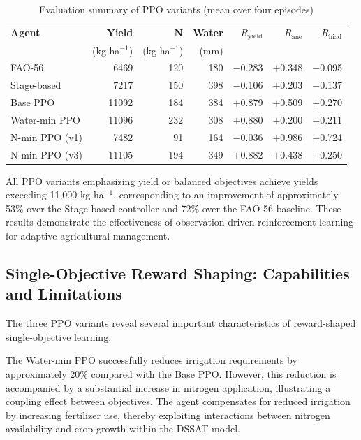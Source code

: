 \begin{table}[ht]
\centering
\caption{Evaluation summary of PPO variants (mean over four episodes)}
\label{tab:ppo_eval}
\small
\renewcommand{\arraystretch}{1.2}
\begin{tabular}{lrrrrrr}
\toprule
\textbf{Agent} & \textbf{Yield} & \textbf{N} & \textbf{Water} & $R_{\text{yield}}$ & $R_{\text{ane}}$ & $R_{\text{hiad}}$ \\
 & (kg ha$^{-1}$) & (kg ha$^{-1}$) & (mm) & & & \\
\midrule
FAO-56           & 6469  & 120 & 180 & $-$0.283 & $+$0.348 & $-$0.095 \\
Stage-based      & 7217  & 150 & 398 & $-$0.106 & $+$0.203 & $-$0.137 \\
Base PPO         & 11092 & 184 & 384 & $+$0.879 & $+$0.509 & $+$0.270 \\
Water-min PPO    & 11096 & 232 & 308 & $+$0.880 & $+$0.200 & $+$0.211 \\
N-min PPO (v1)   & 7482  & 91  & 164 & $-$0.036 & $+$0.986 & $+$0.724 \\
N-min PPO (v3)   & 11105 & 194 & 349 & $+$0.882 & $+$0.438 & $+$0.250 \\
\bottomrule
\end{tabular}
\end{table}

All PPO variants emphasizing yield or balanced objectives achieve yields exceeding 11,000 kg ha$^{-1}$, corresponding to an improvement of approximately 53\% over the Stage-based controller and 72\% over the FAO-56 baseline. These results demonstrate the effectiveness of observation-driven reinforcement learning for adaptive agricultural management.


\subsection{Single-Objective Reward Shaping: Capabilities and Limitations}

The three PPO variants reveal several important characteristics of reward-shaped single-objective learning.

The Water-min PPO successfully reduces irrigation requirements by approximately 20\% compared with the Base PPO. However, this reduction is accompanied by a substantial increase in nitrogen application, illustrating a coupling effect between objectives. The agent compensates for reduced irrigation by increasing fertilizer use, thereby exploiting interactions between nitrogen availability and crop growth within the DSSAT model.


